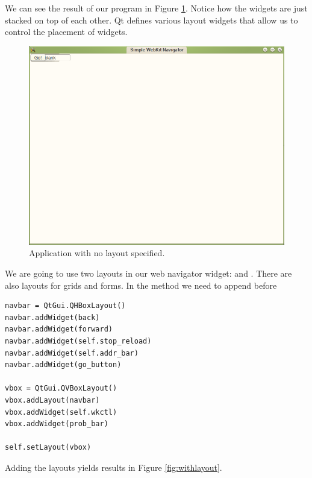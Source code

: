 We can see the result of our program in Figure \ref{fig:nolayout}.  Notice how the widgets are just stacked on top of each other.  Qt defines various layout widgets that allow us to control the placement of widgets. 
\begin{figure}[h]
\centering
\includegraphics[scale=.5]{nolayout.png}
\caption{Application with no layout specified.}
\label{fig:nolayout}
\end{figure}
We are going to use two layouts in our web navigator widget:  and .  There are also layouts for grids and forms.  In the  method we need to append before 
\begin{lstlisting}
navbar = QtGui.QHBoxLayout()
navbar.addWidget(back)
navbar.addWidget(forward)
navbar.addWidget(self.stop_reload)
navbar.addWidget(self.addr_bar)
navbar.addWidget(go_button)

vbox = QtGui.QVBoxLayout()
vbox.addLayout(navbar)
vbox.addWidget(self.wkctl)
vbox.addWidget(prob_bar)

self.setLayout(vbox)
\end{lstlisting}
Adding the layouts yields results in Figure \ref{fig:withlayout}.
